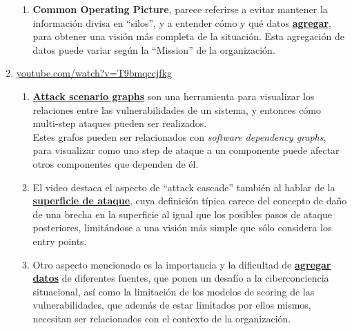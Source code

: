 \begin{enumerate}
\begin{enumerate}
      \item \textbf{Common Operating Picture}, parece referirse a evitar mantener la información divisa en ``silos'', y a entender cómo y qué datos \ul{\textbf{agregar}}, para obtener una visión más completa de la situación. Esta agregación de datos puede variar según la ``Mission'' de la organización. 
   \end{enumerate}
   \item \href{https://www.youtube.com/watch?v=T9bmqccjfkg}{youtube.com/watch?v=T9bmqccjfkg}
   \begin{enumerate}
      \item \textbf{\ul{Attack scenario graphs}} son una herramienta para visualizar los relaciones entre las vulnerabilidades de un sistema, y entonces cómo multi-step ataques pueden ser realizados.\\
      Estes grafos pueden ser relacionados con \textit{software dependency graphs}, para visualizar como uno step de ataque a un componente puede afectar otros componentes que dependen de él.
      \item El video destaca el aspecto de ``attack cascade'' también al hablar de la \textbf{\ul{superficie de ataque}}, cuya definición típica carece del concepto de daño de una brecha en la superficie al igual que los posibles pasos de ataque posteriores, limitándose a una visión más simple que sólo considera los entry points.
      \item Otro aspecto mencionado es la importancia y la dificultad de \ul{\textbf{agregar datos}} de diferentes fuentes, que ponen un desafío a la ciberconciencia situacional, así como la limitación de los modelos de scoring de las vulnerabilidades, que además de estar limitados por ellos mismos, necesitan ser relacionados con el contexto de la organización.
   \end{enumerate}
\end{enumerate}
